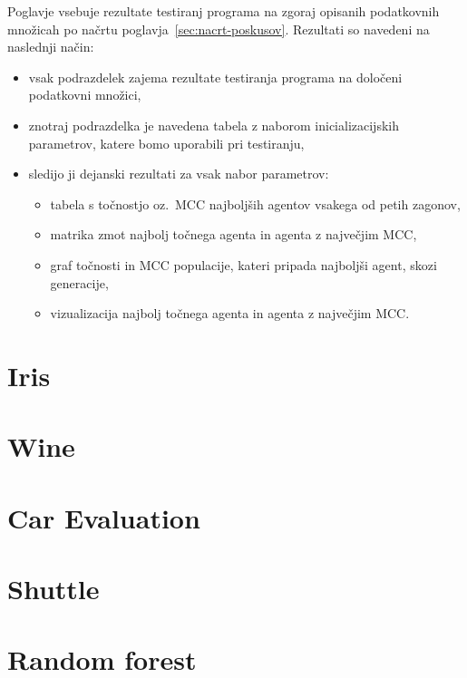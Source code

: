 Poglavje vsebuje rezultate testiranj programa na zgoraj opisanih podatkovnih množicah po načrtu poglavja~\ref{sec:nacrt-poskusov}.
Rezultati so navedeni na naslednji način:
\begin{itemize}
    \item vsak podrazdelek zajema rezultate testiranja programa na določeni podatkovni množici,
    \item znotraj podrazdelka je navedena tabela z naborom inicializacijskih parametrov, katere bomo uporabili pri testiranju,
    \item sledijo ji dejanski rezultati za vsak nabor parametrov:
    \begin{itemize}
        \item tabela s točnostjo oz.\ MCC najboljših agentov vsakega od petih zagonov,
        \item matrika zmot najbolj točnega agenta in agenta z največjim MCC,
        \item graf točnosti in MCC populacije, kateri pripada najboljši agent, skozi generacije,
        \item vizualizacija najbolj točnega agenta in agenta z največjim MCC.
    \end{itemize}
\end{itemize}

\section{Iris}\label{sec:dodatek-iris-test}


\section{Wine}\label{sec:dodatek-wine-test}


\section{Car Evaluation}\label{sec:dodatek-car-test}


\section{Shuttle}\label{sec:dodatek-statlog-test}



\section{Random forest}\label{sec:random-forest-test}


